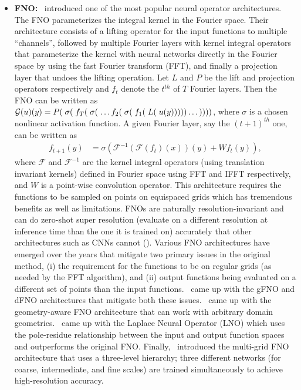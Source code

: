 \begin{itemize}
\item {\bf FNO:}~\citep{li2020fourier} introduced one of the most popular neural operator architectures. The FNO parameterizes the integral kernel in the Fourier space. Their architecture consists of a lifting operator for the input functions to multiple ``channels'', followed by multiple Fourier layers with kernel integral operators that parameterize the kernel with neural networks directly in the Fourier space by using the fast Fourier transform (FFT), and finally a projection layer that undoes the lifting operation. Let $L$ and $P$ be the lift and projection operators respectively and $f_t$ denote the $t^{th}$ of $T$ Fourier layers. Then the FNO can be written as $\mathcal{G}(u)(y) = P(\; \sigma(\; f_T(\; \sigma(\; \dots f_2(\; \sigma(\; f_1(\; L(\; u(y))))) \dots ))))$, where $\sigma$ is a chosen nonlinear activation function. A given Fourier layer, say the $(t+1)^{th}$ one, can be written as
\begin{align}
f_{t+1}(y) &= \sigma\left(\mathcal{F}^{-1}\left( \mathcal{F}(f_t)(x) \right)(y) +  W f_t(y) \right),
\end{align}
where $\mathcal{F}$ and $\mathcal{F}^{-1}$ are the kernel integral operators (using translation invariant kernels) defined in Fourier space using FFT and IFFT respectively, and $W$ is a point-wise convolution operator. This architecture requires the functions to be sampled on points on equispaced grids which has tremendous benefits as well as limitations. FNOs are naturally resolution-invariant and can do zero-shot super resolution (evaluate on a different resolution at inference time than the one it is trained on) accurately that other architectures such as CNNs cannot (\citep[Section 4]{li2020fourier}). Various FNO architectures have emerged over the years that mitigate two primary issues in the original method, (i) the requirement for the functions to be on regular grids (as needed by the FFT algorithm), and (ii) output functions being evaluated on a different set of points than the input functions.~\citep{lu2022comprehensive} came up with the gFNO and dFNO architectures that mitigate both these issues.~\citep{li2023fourier} came up with the geometry-aware FNO architecture that can work with arbitrary domain geometries.~\citep{cao2024laplace} came up with the Laplace Neural Operator (LNO) which uses the pole-residue relationship between the input and output function spaces and outperforms the original FNO. Finally,~\citep{guo2024mgfno} introduced the multi-grid FNO architecture that uses a three-level hierarchy; three different networks (for coarse, intermediate, and fine scales) are trained simultaneously to achieve high-resolution accuracy.


\end{itemize}
